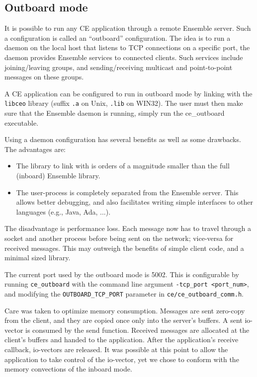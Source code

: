 \subsection{Outboard mode}
It is possible to run any CE application through a remote Ensemble
server. Such a configuration is called an ``outboard'' configuration.
The idea is to run a daemon on the local host that listens to
TCP connections on a specific port, the daemon provides Ensemble
services to connected clients. Such services include joining/leaving groups, 
and sending/receiving multicast and point-to-point
messages on these groups. 

A CE application can be configured to run in outboard mode by linking
with the {\tt libceo} library (suffix {\tt .a} on Unix,  {\tt .lib}
on WIN32). The user must then make sure that the Ensemble daemon is
running, simply run the ce\_outboard executable.

Using a daemon configuration has several benefits as well as some
drawbacks. The advantages are:
\begin{itemize}
\item The library to link with is orders
  of a magnitude smaller than the full (inboard) Ensemble library.
\item The user-process is completely separated from the Ensemble
  server. This allows better debugging, and also facilitates writing simple
  interfaces to other languages (e.g., Java, Ada, ...). 
\end{itemize}

The disadvantage is performance loss. Each message now has to travel
through a socket and another process before being sent on the network;
vice-versa for received messages. This may outweigh the benefits of
simple client code, and a minimal sized library.

The current port used by the outboard mode is 5002. This is
configurable by running {\tt ce\_outboard} with the command line
argument {\tt -tcp\_port <port\_num>}, and modifying the 
{\tt OUTBOARD\_TCP\_PORT} parameter in {\tt ce/ce\_outboard\_comm.h}.

Care was taken to optimize memory consumption. Messages are sent
zero-copy from the client, and they are copied once only into the
server's buffers. A sent io-vector is consumed by the send
function. Received messages are allocated at the client's buffers and
handed to the application. After the application's receive callback,
io-vectors are released. It was possible at this point to allow the
application to take control of the io-vector, yet we chose to conform
with the memory convections of the inboard mode. 


